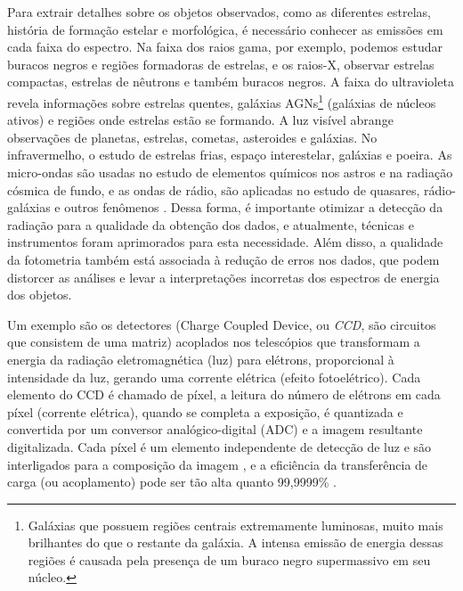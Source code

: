 Para extrair detalhes sobre os objetos observados, como as diferentes estrelas, história de formação estelar e morfológica, é necessário conhecer as emissões em cada faixa do espectro. Na faixa dos raios gama, por exemplo, podemos estudar buracos negros e regiões formadoras de estrelas, e os raios-X, observar estrelas compactas, estrelas de nêutrons e também buracos negros. A faixa do ultravioleta revela informações sobre estrelas quentes, galáxias AGNs\footnote{Galáxias que possuem regiões centrais extremamente luminosas, muito mais brilhantes do que o restante da galáxia. A intensa emissão de energia dessas regiões é causada pela presença de um buraco negro supermassivo em seu núcleo.} (galáxias de núcleos ativos) e regiões onde estrelas estão se formando. A luz visível abrange observações de planetas, estrelas, cometas, asteroides e galáxias. No infravermelho, o estudo de estrelas frias, espaço interestelar, galáxias e poeira. As micro-ondas são usadas no estudo de elementos químicos nos astros e na radiação cósmica de fundo, e as ondas de rádio, são aplicadas no estudo de quasares, rádio-galáxias e outros fenômenos \cite{2023Kepler,2022gastao}. Dessa forma, é importante otimizar a detecção da radiação para a qualidade da obtenção dos dados, e atualmente, técnicas e instrumentos foram aprimorados para esta necessidade. Além disso, a qualidade da fotometria também está associada à redução de erros nos dados, que podem distorcer as análises e levar a interpretações incorretas dos espectros de energia dos objetos.

Um exemplo são os detectores (Charge Coupled Device, ou \emph{CCD}, são circuitos que consistem de uma matriz) acoplados nos telescópios que transformam a energia da radiação eletromagnética (luz) para elétrons, proporcional à intensidade da luz, gerando uma corrente elétrica (efeito fotoelétrico). Cada elemento do CCD é chamado de píxel, a leitura do número de elétrons em cada píxel (corrente elétrica), quando se completa a exposição, é quantizada e convertida por um conversor analógico-digital (ADC) e a imagem resultante digitalizada. Cada píxel é um elemento independente de detecção de luz e são interligados para a composição da imagem \cite{2007soaress, 2023Kepler}, e a eficiência da transferência de carga (ou acoplamento) pode ser tão alta quanto 99,9999\% \cite{2003kitchin}.

